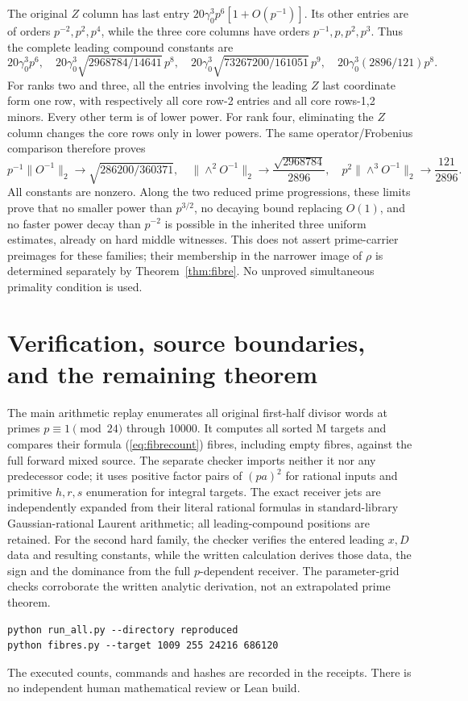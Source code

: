 The original $Z$ column has last entry
$20\gamma_0^3p^6[1+O(p^{-1})]$. Its other entries are of orders
$p^{-2},p^2,p^4$, while the three core columns have orders
$p^{-1},p,p^2,p^3$. Thus the complete leading compound constants are
\[
20\gamma_0^3p^6,
\quad20\gamma_0^3\sqrt{2968784/14641}\,p^8,
\quad20\gamma_0^3\sqrt{73267200/161051}\,p^9,
\quad20\gamma_0^3(2896/121)p^8.
\]
For ranks two and three, all the entries involving the leading $Z$ last
coordinate form one row, with respectively all core row-2 entries and all
core rows-1,2 minors. Every other term is of lower power. For rank four,
eliminating the $Z$ column changes the core rows only in lower powers.
The same operator/Frobenius comparison therefore proves
\begin{equation}\label{eq:endlimits}
 p^{-1}\|O^{-1}\|_2\to\sqrt{286200/360371},\quad
 \|\wedge^2O^{-1}\|_2\to\frac{\sqrt{2968784}}{2896},\quad
 p^2\|\wedge^3O^{-1}\|_2\to\frac{121}{2896}.
\end{equation}
All constants are nonzero. Along the two reduced prime progressions, these
limits prove that no smaller power than $p^{3/2}$, no decaying bound replacing
$O(1)$, and no faster power decay than $p^{-2}$ is possible in the inherited
three uniform estimates, already on hard middle witnesses.
This does not assert prime-carrier preimages for these families; their
membership in the narrower image of $\rho$ is determined separately by
Theorem~\ref{thm:fibre}. No unproved simultaneous primality condition is used.

\section{Verification, source boundaries, and the remaining theorem}
The main arithmetic replay enumerates all original first-half divisor words
at primes $p\equiv1\pmod{24}$ through 10000. It computes all sorted M targets
and compares their formula (\ref{eq:fibrecount}) fibres, including empty fibres,
against the full forward mixed source. The separate checker imports neither
it nor any predecessor code; it uses positive factor pairs of $(pa)^2$ for
rational inputs and primitive $h,r,s$ enumeration for integral targets.
The exact receiver jets are independently expanded from their literal
rational formulas in standard-library Gaussian-rational Laurent arithmetic;
all leading-compound positions are retained. For the second hard family, the
checker verifies the entered leading $x,D$ data and resulting constants,
while the written calculation derives those data, the sign and the dominance
from the full $p$-dependent receiver. The parameter-grid checks corroborate the
written analytic derivation, not an extrapolated prime theorem.
\begin{verbatim}
python run_all.py --directory reproduced
python fibres.py --target 1009 255 24216 686120
\end{verbatim}
The executed counts, commands and hashes are recorded in the receipts.
There is no independent human mathematical review or Lean build.

